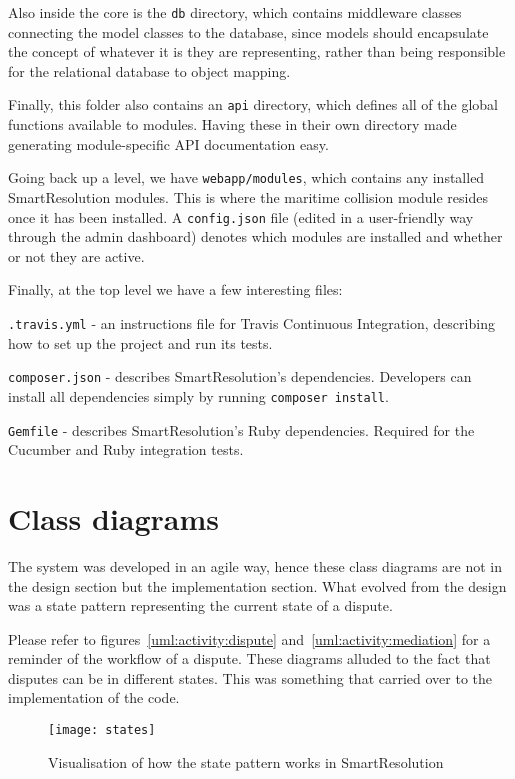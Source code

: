 Also inside the core is the \lstinline{db} directory, which contains middleware classes connecting the model classes to the database, since models should encapsulate the concept of whatever it is they are representing, rather than being responsible for the relational database to object mapping.

Finally, this folder also contains an \lstinline{api} directory, which defines all of the global functions available to modules. Having these in their own directory made generating module-specific API documentation easy.

Going back up a level, we have \lstinline{webapp/modules}, which contains any installed SmartResolution modules. This is where the maritime collision module resides once it has been installed. A \lstinline{config.json} file (edited in a user-friendly way through the admin dashboard) denotes which modules are installed and whether or not they are active.

Finally, at the top level we have a few interesting files:

\lstinline{.travis.yml} - an instructions file for Travis Continuous Integration, describing how to set up the project and run its tests.

\lstinline{composer.json} - describes SmartResolution's dependencies. Developers can install all dependencies simply by running \lstinline{composer install}.

\lstinline{Gemfile} - describes SmartResolution's Ruby dependencies. Required for the Cucumber and Ruby integration tests.

\section{Class diagrams}

The system was developed in an agile way, hence these class diagrams are not in the design section but the implementation section. What evolved from the design was a state pattern representing the current state of a dispute.

Please refer to figures~\ref{uml:activity:dispute} and~\ref{uml:activity:mediation} for a reminder of the workflow of a dispute. These diagrams alluded to the fact that disputes can be in different states. This was something that carried over to the implementation of the code.

\begin{figure}[h!]
  \centering
    \ifimages
    \texttt{[image: states]}
    \fi
  \caption{Visualisation of how the state pattern works in SmartResolution}
  \label{uml:states}
\end{figure}

